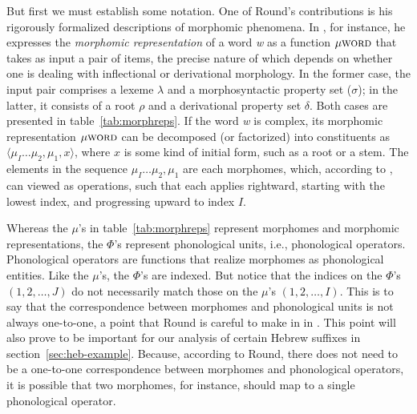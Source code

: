   But first we must establish some notation. 
  One of Round's contributions is his rigorously formalized descriptions of 
  morphomic phenomena. In \cite{round:2011}, for instance, 
  he expresses the \emph{morphomic representation} of a word 
  \textit{w} as a function $\mu{\textsc{word}}$ that 
  takes as input a pair of items, the precise nature
  of which depends on whether one is dealing with inflectional or 
  derivational morphology. In the former case, the input pair comprises 
  a lexeme $\lambda$ and a morphosyntactic property set ($\sigma$); in the latter, 
  it consists of a root $\rho$ and a derivational property set $\delta$. 
  Both cases are presented in table~\ref{tab:morphreps}. If the word \textit{w} 
 is complex, its morphomic representation $\mu{\textsc{word}}$ 
  can be decomposed (or factorized) into constituents as  
  $\langle  \mu_{I} \dots \mu_{2}, \mu_{1}, x \rangle$, where $x$ 
  is some kind of initial form, such as a root or a stem. The elements in the sequence 
  $ \mu_{I} \dots \mu_{2}, \mu_{1}$ are each morphomes, 
  which, according to \cite{round:2015}, can viewed as operations, 
  such that each applies rightward, starting with the lowest index, and progressing upward
  to index $I$.
  
  Whereas the $\mu$'s in table~\ref{tab:morphreps} represent 
  morphomes and morphomic representations, the $\Phi$'s represent 
  phonological units, i.e., phonological operators. Phonological operators are functions that realize morphomes as phonological entities. 
  Like the $\mu$'s, 
  the $\Phi$'s are indexed. But notice that the  indices on the $\Phi$'s $(1,2,\dots,J)$ 
  do not necessarily match those on the $\mu$'s $(1,2,\dots,I)$. This is to say that
the correspondence between 
  morphomes and phonological units is not always one-to-one, a point that Round is careful to make in 
  in \cite{round:2015}. This point
  will also prove to be important for our analysis of certain Hebrew 
  suffixes in section~\ref{sec:heb-example}. Because, according to Round, there does not need to be a one-to-one correspondence between morphomes and phonological operators, it is possible that two morphomes, for instance, should map to a single phonological operator. 

